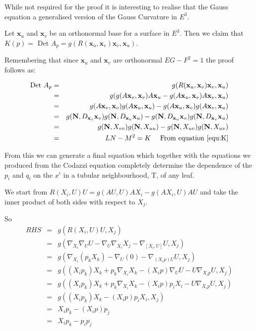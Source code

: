 \begin{aside}

While not required for the proof it is interesting to realise that the Gauss equation a generalised version of the Gauss Curvature in $E^3$.

Let $\mathbf x_u$ and $\mathbf x_v$ be an orthonormal base for a surface in $E^3$. Then we claim that $K(p) = \mbox{ Det }A_p = g(R(\mathbf x_u,\mathbf x_v)\mathbf x_v,\mathbf x_u)$.

Remembering that since $\mathbf x_u$ and $\mathbf x_v$ are orthonormal $EG-F^2 = 1$ the proof follows as:

\begin{eqnarray}
\nonumber
\mbox{Det }A_p &=& g(R(\mathbf x_u,\mathbf x_v)\mathbf x_v,\mathbf x_u) \\
\nonumber
&=& g(g(A\mathbf x_v,\mathbf x_v)A\mathbf x_u - g(A\mathbf x_u,\mathbf x_v)A\mathbf x_v,\mathbf x_u) \\
\nonumber
&=& g(A\mathbf x_v,\mathbf x_v)g(A\mathbf x_u,\mathbf x_u) - g(A\mathbf x_u,\mathbf x_v)g(A\mathbf x_v,\mathbf x_u) \\
\nonumber
&=&g(\mathbf N,D_{\mathbf x_v}\mathbf x_v)g(\mathbf N,D_{\mathbf x_u}\mathbf x_u) - g(\mathbf N, D_{\mathbf x_u}\mathbf x_v)g(\mathbf N, D_{\mathbf x_v}\mathbf x_u) \\
\nonumber
&=&g(\mathbf N,X_{vv})g(\mathbf N,X_{uu}) - g(\mathbf N, X_{uv})g(\mathbf N, X_{uv})\\
\nonumber
&=& LN - M^2 = K \mbox{\ \ \ \ From equation \ref{equ:K}}
\end{eqnarray}
\end{aside}


From this we can generate a final equation which together with the equations we produced from the Codazzi equation completely determine the dependence of the $p_i$ and $q_i$ on the $x^i$ in a tubular neighbourhood, T, of any leaf.

We start from $R(X_i,U)U = g(AU,U)AX_i-g(AX_i,U)AU$ and take the inner product of both sides with respect to $X_j$.

So
\begin{eqnarray}
\nonumber
RHS &=& g(R(X_i,U)U,X_j)\\
\nonumber
&=& g(\nabla_{X_i}\nabla_{U}U - \nabla_U\nabla_{X_i}X_j-\nabla_{[X_i,U]}U, X_j) \\
\nonumber
&=&g(\nabla_{X_i}(p_kX_k)-\nabla_U(0)-\nabla_{(X_ip)U}U, X_j) \\
\nonumber
&=&g((X_ip_k)X_k + p_k\nabla_{X_i}X_k -(X_ip)\nabla_UU - U\nabla_{X_ip}U,X_j) \\
\nonumber
&=&g((X_ip_k)X_k + p_k\nabla_{X_i}X_k-(X_ip)p_iX_i - U\nabla_{X_ip}U,X_j) \\
\nonumber
&=&g((X_ip_k)X_k -(X_ip)p_iX_i,X_j) \\
\nonumber
&=&X_ip_k-(X_ip)p_j \\
\nonumber
&=&X_ip_k-p_ip_j
\end{eqnarray}

